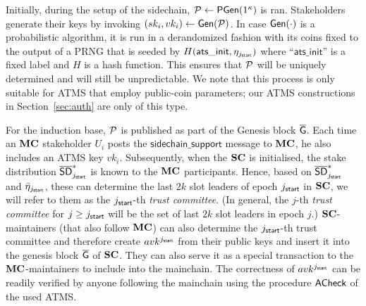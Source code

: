 
Initially, during the setup of the sidechain, $\mathcal{P} \gets
\textsf{PGen}(1^\kappa)$ is ran. Stakeholders generate
their keys by invoking $(sk_i, vk_i) \gets \mathsf{Gen}(\mathcal{P})$.
In case $\mathsf{Gen}(\cdot)$ is a probabilistic algorithm, it is run in a derandomized
fashion with its coins fixed to the output of a PRNG that is seeded by
$H(\mathsf{ats\_init}, \eta_{j_{\mathsf{start}}})$ where ``$\mathsf{ats\_init}$'' is a fixed
label and $H$ is a hash function. This ensures that $\mathcal{P}$ will
be uniquely determined and will still be unpredictable. We note
that this process is only suitable for ATMS that employ public-coin parameters;
our ATMS constructions in Section~\ref{sec:auth} are only of this type.

For the induction base, $\mathcal{P}$ is published as part of the Genesis block
$\mathsf{\overline{G}}$.
Each time an $\mathbf{MC}$ stakeholder $U_i$
posts the
$\mathsf{sidechain\_support}$ message to $\mathbf{MC}$, he  also includes an ATMS key $vk_i$.
Subsequently,
when the $\mathbf{SC}$ is initialised, the
stake distribution $\mathsf{\overline{SD}}^*_{j_{\mathsf{start}}}$ is known to the $\mathbf{MC}$ participants. Hence,
based on $\mathsf{\overline{SD}}^*_{j_{\mathsf{start}}}$ and $\bar{\eta}_{j_{\mathsf{start}}}$,
these can determine the last $2k$ slot leaders of epoch $j_{\mathsf{start}}$ in $\mathbf{SC}$,
we will refer to them as the $j_{\mathsf{start}}$-{th} \emph{trust committee}.
(In general, the $j$-th \emph{trust committee} for $j\geq j_{\mathsf{start}}$ will be the set
of last $2k$ slot leaders in epoch $j$.)
$\mathbf{SC}$-maintainers (that also follow $\mathbf{MC}$) can also determine the $j_{\mathsf{start}}$-{th} trust committee
and therefore create $avk^{j_{\mathsf{start}}}$ from their public keys and insert it into
the genesis block $\mathsf{\overline{G}}$ of  $\mathbf{SC}$. They can also serve it as a special
transaction to the $\mathbf{MC}$-maintainers to include into the mainchain.
The correctness of $avk^{j_{\mathsf{start}}}$ can be
readily verified by anyone following the mainchain using the procedure
$\textsf{ACheck}$ of the used ATMS.

